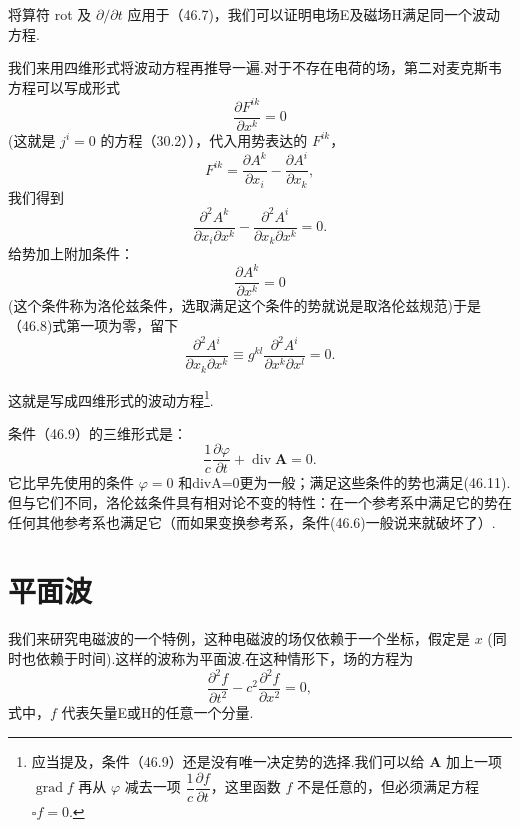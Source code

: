 将算符 rot 及 $\partial/\partial t$ 应用于（46.7)，我们可以证明电场E及磁场H满足同一个波动方程.

我们来用四维形式将波动方程再推导一遍.对于不存在电荷的场，第二对麦克斯韦方程可以写成形式
\begin{equation*}
  \frac{\partial F^{ik}}{\partial x^k}=0
\end{equation*}
(这就是 $j^i = 0$ 的方程（30.2）），代入用势表达的 $F^{ik}$，
\begin{equation*}
  F^{ik}=\frac{\partial A^k}{\partial x_i}-\frac{\partial A^i}{\partial x_k},
\end{equation*}
我们得到
\begin{equation}
  \frac{\partial^2 A^k}{\partial x_i\partial x^k}
  -\frac{\partial^2 A^i}{\partial x_k\partial x^k}=0.
\end{equation}
给势加上附加条件：
\begin{equation}
  \frac{\partial A^k}{\partial x^k}=0
\end{equation}
(这个条件称为洛伦兹条件，选取满足这个条件的势就说是取洛伦兹规范)于是（46.8)式第一项为零，留下
\begin{equation}
  \frac{\partial^2 A^i}{\partial x_k\partial x^k}
  \equiv g^{kl}\frac{\partial^2 A^i}{\partial x^k\partial x^l}=0.
\end{equation}

这就是写成四维形式的波动方程\footnote{应当提及，条件（46.9）还是没有唯一决定势的选择.我们可以给 $\boldsymbol{A}$ 加上一项 $\operatorname{grad}f$ 再从 $\varphi$ 减去一项 $\dfrac{1}{c}\dfrac{\partial f}{\partial t}$，这里函数 $f$ 不是任意的，但必须满足方程 $\square f=0$.}.

条件（46.9）的三维形式是：
\begin{equation}
  \frac{1}{c}\frac{\partial\varphi}{\partial t}+\operatorname{div}\boldsymbol{A}=0.
\end{equation}
它比早先使用的条件 $\varphi = 0$ 和divA=0更为一般；满足这些条件的势也满足(46.11).但与它们不同，洛伦兹条件具有相对论不变的特性：在一个参考系中满足它的势在任何其他参考系也满足它（而如果变换参考系，条件(46.6)一般说来就破坏了）.

\section{平面波}

我们来研究电磁波的一个特例，这种电磁波的场仅依赖于一个坐标，假定是 $x$ (同时也依赖于时间).这样的波称为平面波.在这种情形下，场的方程为
\begin{equation}
  \frac{\partial^2 f}{\partial t^2}-c^2\frac{\partial^2 f}{\partial x^2}=0,
\end{equation}
式中，$f$ 代表矢量E或H的任意一个分量.

